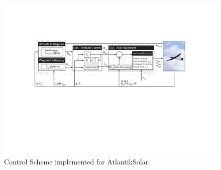 \begin{figure}[tb]
    \centering
     \includegraphics[width=\linewidth]{images/11_ControlScheme/ControlScheme}
    \caption{Control Scheme implemented for AtlantikSolar.}
    \label{fig:ControlScheme}
\end{figure}

